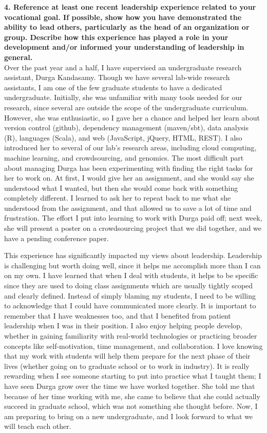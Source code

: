 \documentclass{article}
\begin{document}
\pagestyle{plain}

\noindent\textbf{4.  Reference at least one recent leadership experience related to your vocational goal. If possible, show how you have demonstrated the ability to lead others, particularly as the head of an organization or group. Describe how this experience has played a role in your development and/or informed your understanding of leadership in general.}\\

Over the past year and a half, I have supervised an undergraduate research assistant, Durga Kandasamy.  
Though we have several lab-wide research assistants, I am one of the few graduate students to have a dedicated undergraduate.
Initially, she was unfamiliar with many tools needed for our research, since several are outside the scope of the undergraduate curriculum.
However, she was enthusiastic, so I gave her a chance and helped her learn about version control (github), dependency management (maven/sbt), data analysis (R), languages (Scala), and web (JavaScript, jQuery, HTML, REST).
I also introduced her to several of our lab's research areas, including cloud computing, machine learning, and crowdsourcing, and genomics.
The most difficult part about managing Durga has been experimenting with finding the right tasks for her to work on.
At first, I would give her an assignment, and she would say she understood what I wanted, but then she would come back with something completely different.
I learned to ask her to repeat back to me what she understood from the assignment, and that allowed us to save a lot of time and frustration.
The effort I put into learning to work with Durga paid off; next week, she will present a poster on a crowdsourcing project that we did together, and we have a pending conference paper.

This experience has significantly impacted my views about leadership.
Leadership is challenging but worth doing well, since it helps me accomplish more than I can on my own.
I have learned that when I deal with students, it helps to be specific since they are used to doing class assignments which are usually tightly scoped and clearly defined.
Instead of simply blaming my students, I need to be willing to acknowledge that I could have communicated more clearly.
It is important to remember that I have weaknesses too, and that I benefited from patient leadership when I was in their position.
I also enjoy helping people develop, whether in gaining familiarity with real-world technologies or practicing broader concepts like self-motivation, time management, and collaboration.
I love knowing that my work with students will help them prepare for the next phase of their lives (whether going on to graduate school or to work in industry).
It is really rewarding when I see someone starting to put into practice what I taught them; I have seen Durga grow over the time we have worked together.
She told me that because of her time working with me, she came to believe that she could actually succeed in graduate school, which was not something she thought before.
Now, I am preparing to bring on a new undergraduate, and I look forward to what we will teach each other.
\end{document}
